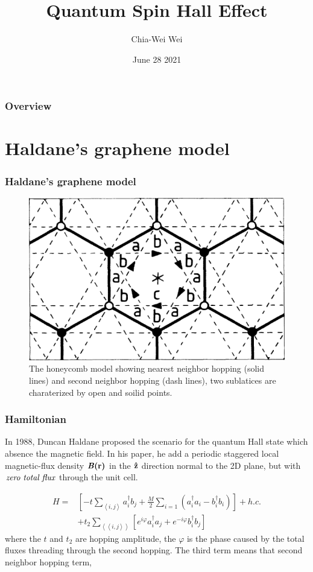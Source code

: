 \documentclass{beamer}
\title{Quantum Spin Hall Effect}
\author{Chia-Wei Wei}
\date{June 28 2021}
\institute[NTHU] %
{National Tsing Hua University\\} %
\begin{document}
  
\begin{frame}
\maketitle
\end{frame}

\begin{frame}
\frametitle{Overview}
\tableofcontents
\end{frame}
\section{Haldane's graphene model}
\begin{frame}
\frametitle{Haldane's graphene model}
\begin{figure}[htpb]
  \centering
  \includegraphics[width=0.7\linewidth]{graphene.png}
  \caption{The honeycomb model showing nearest neighbor hopping (solid lines)
  and second neighbor hopping (dash lines), two sublatices are charaterized
by open and soilid points.}%
  \label{fig:graphene}
\end{figure}
\end{frame}

\begin{frame}
  \frametitle{Hamiltonian}
In 1988, Duncan Haldane proposed the scenario for the quantum Hall state
which absence the magnetic field. In his paper, he add a periodic staggered 
local magnetic-flux density $\textbf{\emph{B}(r)}$ in the ${\bf \hat{z}}$
direction normal to the 2D plane, but with $\emph{zero total flux}$ through
the unit cell. 

\begin{equation*}
\begin{split}
  H = &[- t\sum_{\left<i,j\right>}a^{\dagger}_{i}b_{j} + \frac{M}{2}
  \sum_{i=1} (a^{\dagger}_{i}a_{i} - b^{\dagger}_{i}b_{i})] + h.c.\\ 
  & + t_{2}\sum_{\left<\left<i,j\right>\right>}[e^{i\varphi}a^{\dagger}_{i}a_{j} +
  e^{-i\varphi}b^{\dagger}_{i}b_{j}] 
\end{split}
\end{equation*}
where the $t$ and $t_{2}$ are hopping amplitude, the $\varphi$ is the phase
caused by the total fluxes threading through the second hopping.
The third term means that second neighbor hopping term, 

\end{frame}
\end{document}
